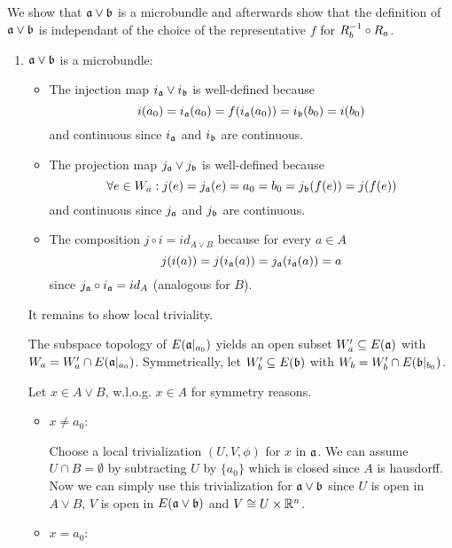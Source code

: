 \begin{myproof}
    We show that $\mathfrak{a} \vee \mathfrak{b}$ is a microbundle and afterwards show
    that the definition of $\mathfrak{a} \vee \mathfrak{b}$ is independant of the choice of the representative $f$ for $R_b^{-1} \circ R_a$.
    \begin{enumerate}
        \item $\mathfrak{a} \vee \mathfrak{b}$ is a microbundle:
        \begin{itemize}
            \item The injection map $i_{\mathfrak{a}} \vee i_{\mathfrak{b}}$ is well-defined because 
            \[ i(a_0) = i_{\mathfrak{a}}(a_0) = f(i_{\mathfrak{a}}(a_0)) = i_{\mathfrak{b}}(b_0) = i(b_0) \]
            and continuous since $i_{\mathfrak{a}}$ and $i_{\mathfrak{b}}$ are continuous.
            \item The projection map $j_{\mathfrak{a}} \vee j_{\mathfrak{b}}$ is well-defined because
            \[ \forall e \in W_a: j(e) = j_{\mathfrak{a}}(e) = a_0 = b_0 = j_{\mathfrak{b}}(f(e)) = j(f(e)) \]
            and continuous since $j_{\mathfrak{a}}$ and $j_{\mathfrak{b}}$ are continuous.
            \item The composition $j \circ i = id_{A \vee B}$ because for every $a \in A$
            \[ j(i(a)) = j(i_{\mathfrak{a}}(a)) = j_{\mathfrak{a}}(i_{\mathfrak{a}}(a)) = a \]
            since $j_{\mathfrak{a}} \circ i_{\mathfrak{a}} = id_A$ (analogous for $B$).
        \end{itemize}
        It remains to show local triviality.

        The subspace topology of $E(\mathfrak{a}\vert_{a_0})$ yields an open subset $W_a' \subseteq{} E(\mathfrak{a})$ with $W_a = W_a' \cap E(\mathfrak{a}\vert_{a_0})$.
        Symmetrically, let $W_b' \subseteq{} E(\mathfrak{b})$ with $W_b = W_b' \cap E(\mathfrak{b}\vert_{b_0})$.

        Let $x \in A \vee B$, w.l.o.g. $x \in A$ for symmetry reasons.
        \begin{itemize}
            \item $x \neq a_0$:
            
            Choose a local trivialization $(U, V, \phi)$ for $x$ in $\mathfrak{a}$.
            We can assume $U \cap B = \emptyset$ by subtracting $U$ by $\{a_0\}$ which is closed since $A$ is hausdorff.
            Now we can simply use this trivialization for $\mathfrak{a} \vee \mathfrak{b}$
            since $U$ is open in $A \vee B$, $V$ is open in $E(\mathfrak{a} \vee \mathfrak{b})$ and $V \cong U \times \mathbb{R}^n$.
            \item $x = a_0$:
            

\end{itemize}
\end{enumerate}
\end{myproof}
